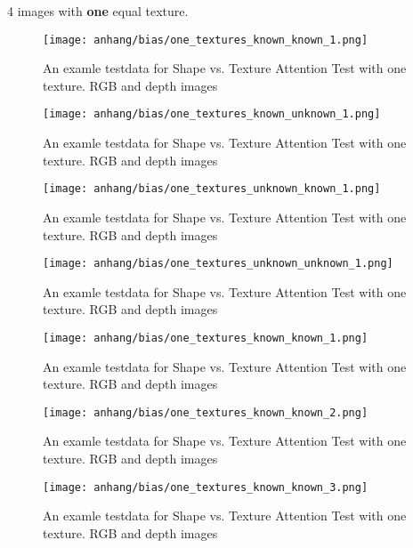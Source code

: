 	\FloatBarrier
	\clearpage

	4 images with \textbf{one} equal texture.
	
	\begin{figure}[H]
		\centering
		\texttt{[image: anhang/bias/one\_textures\_known\_known\_1.png]}
		\caption[An examle testdata for Shape vs. Texture Attention Test with one texture. RGB and depth images]{An examle testdata for Shape vs. Texture Attention Test with one texture. RGB and depth images}
	\end{figure}
	\begin{figure}[H]
		\centering
		\texttt{[image: anhang/bias/one\_textures\_known\_unknown\_1.png]}
		\caption[An examle testdata for Shape vs. Texture Attention Test with one texture. RGB and depth images]{An examle testdata for Shape vs. Texture Attention Test with one texture. RGB and depth images}
	\end{figure}
	\begin{figure}[H]
		\centering
		\texttt{[image: anhang/bias/one\_textures\_unknown\_known\_1.png]}
		\caption[An examle testdata for Shape vs. Texture Attention Test with one texture. RGB and depth images]{An examle testdata for Shape vs. Texture Attention Test with one texture. RGB and depth images}
	\end{figure}
	\begin{figure}[H]
		\centering
		\texttt{[image: anhang/bias/one\_textures\_unknown\_unknown\_1.png]}
		\caption[An examle testdata for Shape vs. Texture Attention Test with one texture. RGB and depth images]{An examle testdata for Shape vs. Texture Attention Test with one texture. RGB and depth images}
	\end{figure}
	
	
	\iffalse
	\begin{figure}[H]
		\centering
		\texttt{[image: anhang/bias/one\_textures\_known\_known\_1.png]}
		\caption[An examle testdata for Shape vs. Texture Attention Test with one texture. RGB and depth images]{An examle testdata for Shape vs. Texture Attention Test with one texture. RGB and depth images}
	\end{figure}
	\begin{figure}[H]
		\centering
		\texttt{[image: anhang/bias/one\_textures\_known\_known\_2.png]}
		\caption[An examle testdata for Shape vs. Texture Attention Test with one texture. RGB and depth images]{An examle testdata for Shape vs. Texture Attention Test with one texture. RGB and depth images}
	\end{figure}
	\begin{figure}[H]
		\centering
		\texttt{[image: anhang/bias/one\_textures\_known\_known\_3.png]}
		\caption[An examle testdata for Shape vs. Texture Attention Test with one texture. RGB and depth images]{An examle testdata for Shape vs. Texture Attention Test with one texture. RGB and depth images}
	\end{figure}
	
